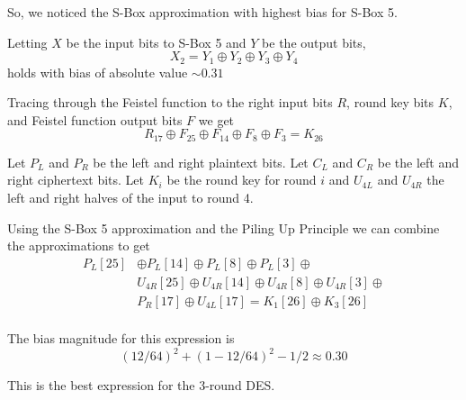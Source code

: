 \documentclass[9pt]{beamer}
\begin{document}
\begin{frame}
So, we noticed the S-Box approximation with highest bias for S-Box 5.

\vspace{5mm}
\pause Letting $X$ be the input bits to S-Box 5 and $Y$ be the output bits,
\[ X_{2} = Y_{1} \oplus Y_{2} \oplus Y_{3} \oplus Y_{4} \]
holds with bias of absolute value $\sim 0.31$

\vspace{5mm}
\pause Tracing through the Feistel function to the right input bits $R$, round key bits $K$, and Feistel function output bits $F$ we get
\[ R_{17} \oplus F_{25} \oplus F_{14} \oplus F_{8} \oplus F_{3} = K_{26} \]

\end{frame}

\begin{frame}
Let $P_L$ and $P_R$ be the left and right plaintext bits. Let $C_L$ and $C_R$ be the left and right ciphertext bits. Let $K_i$ be the round key for round $i$ and $U_{4L}$ and $U_{4R}$ the left and right halves of the input to round 4.

\vspace{5mm}
\pause Using the S-Box 5 approximation and the Piling Up Principle we can combine the approximations to get
\begin{align*}
 P_L[25] & \oplus P_L[14] \oplus P_L[8] \oplus P_L[3] \oplus \\
         & U_{4R}[25] \oplus U_{4R}[14] \oplus U_{4R}[8] \oplus U_{4R}[3] \oplus \\
			& P_R[17] \oplus U_{4L}[17] = K_1[26] \oplus K_3[26] \\
\end{align*}

\pause The bias magnitude for this expression is
\[ (12/64)^2 + (1 - 12/64)^2 - 1/2 \approx 0.30 \]

\pause This is the best expression for the 3-round DES.
\end{frame}
\end{document}
